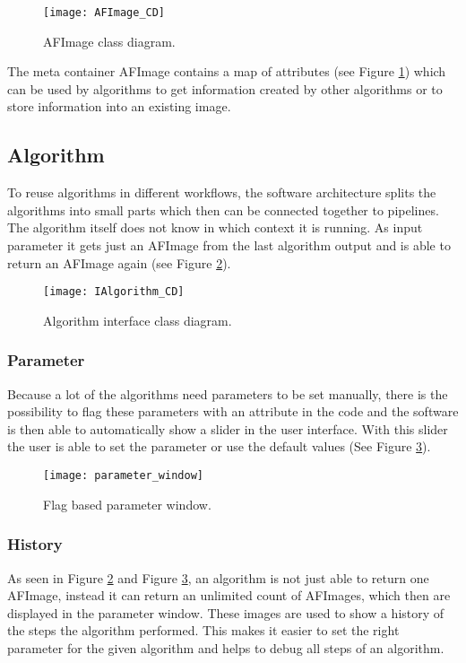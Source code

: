 \begin{figure}[h]
  \centering
      \texttt{[image: AFImage\_CD]}
  \caption{AFImage class diagram.}
  \label{fig:AFImage_CD}
\end{figure}

The meta container AFImage contains a map of attributes (see Figure \ref{fig:AFImage_CD}) which can be used by algorithms to get information created by other algorithms or to store information into an existing image.


\subsection{Algorithm}
To reuse algorithms in different workflows, the software architecture splits the algorithms into small parts which then can be connected together to pipelines. The algorithm itself does not know in which context it is running. As input parameter it gets just an AFImage from the last algorithm output and is able to return an AFImage again (see Figure \ref{fig:IAlgorithm_CD}). 

\begin{figure}[h]
  \centering
      \texttt{[image: IAlgorithm\_CD]}
  \caption{Algorithm interface class diagram.}
  \label{fig:IAlgorithm_CD}
\end{figure}

\subsubsection{Parameter}
Because a lot of the algorithms need parameters to be set manually, there is the possibility to flag these parameters with an attribute in the code and the software is then able to automatically show a slider in the user interface. With this slider the user is able to set the parameter or use the default values (See Figure \ref{fig:parameter_window}).


\begin{figure}[h]
  \centering
      \texttt{[image: parameter\_window]}
  \caption{Flag based parameter window.}
  \label{fig:parameter_window}
\end{figure}

\subsubsection{History}
As seen in Figure \ref{fig:IAlgorithm_CD} and Figure \ref{fig:parameter_window}, an algorithm is not just able to return one AFImage, instead it can return an unlimited count of AFImages, which then are displayed in the parameter window. These images are used to show a history of the steps the algorithm performed. This makes it easier to set the right parameter for the given algorithm and helps to debug all steps of an algorithm.

